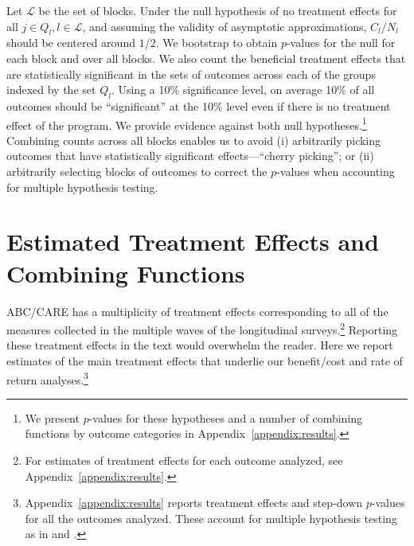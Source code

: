 Let $\mathcal{L}$ be the set of blocks. Under the null hypothesis of no treatment effects for all $j \in Q_l, l \in \mathcal{L}$, and assuming the validity of asymptotic approximations, $C_l / N_l$ should be centered around $1/2$. We bootstrap to obtain $p$-values for the null for each block and over all blocks. We also count the beneficial treatment effects that are statistically significant in the sets of outcomes across each of the groups indexed by the set $Q_l$. Using a 10\% significance level, on average 10\% of all outcomes should be ``significant'' at the 10\% level even if there is no treatment effect of the program. We provide evidence against both null hypotheses.\footnote{We present $p$-values for these hypotheses and a number of combining functions by outcome categories in Appendix~\ref{appendix:results}.} Combining counts across all blocks enables us to avoid (i) arbitrarily picking outcomes that have statistically significant effects---``cherry picking''; or (ii) arbitrarily selecting blocks of outcomes to correct the $p$-values when accounting for multiple hypothesis testing.

\section{Estimated Treatment Effects and Combining Functions}\label{section:c-functions}

ABC/CARE has a multiplicity of treatment effects corresponding to all of the measures collected in the multiple waves of the longitudinal surveys.\footnote{For estimates of treatment effects for each outcome analyzed, see Appendix~\ref{appendix:results}.} Reporting these treatment effects in the text would overwhelm the reader. Here we report estimates of the main treatment effects that underlie our benefit/cost and rate of return analyses.\footnote{Appendix~\ref{appendix:results} reports treatment effects and step-down $p$-values for all the outcomes analyzed. These account for multiple hypothesis testing as in \citet{Lehman_Romano_2005_AnnStat} and \citet{Romano_Shaikh_2006_AnnStat}.}

